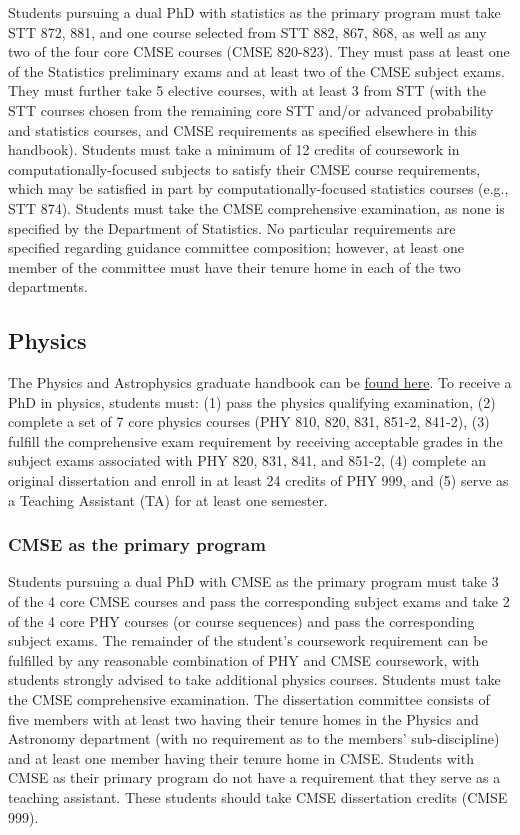 Students pursuing a dual PhD with statistics as the primary program
must take STT 872, 881, and one course selected from STT 882, 867,
868, as well as any two of the four core CMSE courses (CMSE 820-823).
They must pass at least one of the Statistics preliminary exams and at
least two of the CMSE subject exams.  They must further take 5
elective courses, with at least 3 from STT (with the STT courses
chosen from the remaining core STT and/or advanced probability and
statistics courses, and CMSE requirements as specified elsewhere in
this handbook).  Students must take a minimum of 12 credits of
coursework in computationally-focused subjects to satisfy their CMSE
course requirements, which may be satisfied in part by computationally-focused
statistics courses (e.g., STT 874).  Students must take the CMSE comprehensive
examination, as none is specified by the Department of Statistics.  
No particular requirements are specified regarding
guidance committee composition; however, at least one member of the
committee must have their tenure home in each of the two departments.


\subsection{Physics}

The Physics and Astrophysics graduate handbook can be \href{http://www.pa.msu.edu/grad/GradHandbook.pdf}{found
  here}.  
To receive a PhD in physics, students must: (1) pass the physics
qualifying examination, (2) complete a set of 7 core physics courses
(PHY 810, 820, 831, 851-2, 841-2), (3) fulfill the comprehensive exam
requirement by receiving acceptable grades in the subject exams
associated with PHY 820, 831, 841, and 851-2, (4) complete an original
dissertation and enroll in at least 24 credits of PHY 999, and (5)
serve as a Teaching Assistant (TA) for at least one semester.

\subsubsection{CMSE as the primary program}

Students pursuing a dual PhD with CMSE as the primary program must
take 3 of the 4 core CMSE courses and pass the corresponding subject
exams and take 2 of the 4 core PHY courses (or course sequences) and
pass the corresponding subject exams.  The remainder of the student's
coursework requirement can be fulfilled by any reasonable combination
of PHY and CMSE coursework, with students strongly advised to take
additional physics courses.  Students must take the CMSE comprehensive
examination.  The dissertation committee consists of five members with
at least two having their tenure homes in the Physics and Astronomy
department (with no requirement as to the members' sub-discipline) and
at least one member having their tenure home in CMSE.  Students with
CMSE as their primary program do not have a requirement that they
serve as a teaching assistant.  These students should take CMSE
dissertation credits (CMSE 999).


